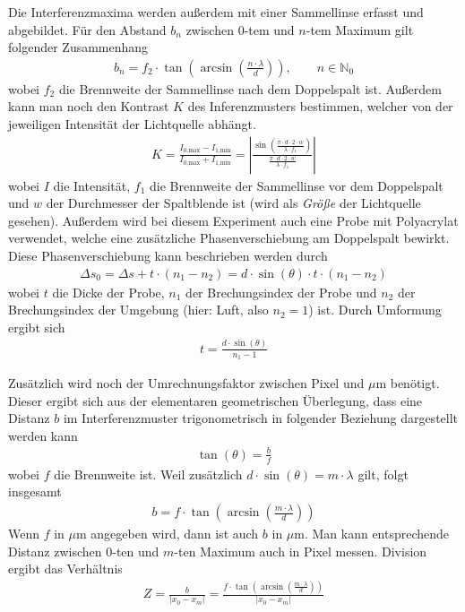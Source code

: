 \documentclass{article}
\begin{document}
Die Interferenzmaxima werden außerdem mit einer Sammellinse erfasst und abgebildet. Für den Abstand $b_n$ zwischen $0$-tem und $n$-tem Maximum gilt folgender Zusammenhang 
\begin{align}
b_n = f_2 \cdot \tan\left( \operatorname{arcsin}\left(\frac{n\cdot\lambda}{d}\right)\right), \qquad n\in\mathbb{N}_0
\end{align}
wobei $f_2$ die Brennweite der Sammellinse nach dem Doppelspalt ist. Außerdem kann man noch den Kontrast $K$ des Inferenzmusters bestimmen, welcher von der jeweiligen Intensität der Lichtquelle abhängt.
\begin{align}
K = \frac{I_\text{0,max}-I_\text{1,min}}{I_\text{0,max}+I_\text{1,min}} = \left| \frac{\sin\left(\frac{\pi\cdot d\cdot 2\cdot w}{\lambda\cdot f_1}\right)}{ \frac{\pi\cdot d\cdot 2\cdot w}{\lambda\cdot f_1} }\right|
 \label{eq:kontrast}
\end{align}
wobei $I$ die Intensität, $f_1$ die Brennweite der Sammellinse vor dem Doppelspalt und $w$ der Durchmesser der Spaltblende ist (wird als \textit{Größe} der Lichtquelle gesehen). Außerdem wird bei diesem Experiment auch eine Probe mit Polyacrylat verwendet, welche eine zusätzliche Phasenverschiebung am Doppelspalt bewirkt. Diese Phasenverschiebung kann beschrieben werden durch
\begin{align}
\Delta s_0 = \Delta s + t\cdot (n_1-n_2) = d\cdot\sin(\theta)\cdot t\cdot (n_1-n_2)
\end{align}
wobei $t$ die Dicke der Probe, $n_1$ der Brechungsindex der Probe und $n_2$ der Brechungsindex der Umgebung (hier: Luft, also $n_2 = 1$) ist. Durch Umformung ergibt sich
\begin{align}
\label{eq:schichtdicke}
t = \frac{d\cdot \sin(\theta)}{n_1-1}
\end{align}


Zusätzlich wird noch der Umrechnungsfaktor zwischen Pixel und $\mu$m benötigt. Dieser ergibt sich aus der elementaren geometrischen Überlegung, dass eine Distanz $b$ im Interferenzmuster trigonometrisch in folgender Beziehung dargestellt werden kann
\begin{align}
\label{eq:theta}
\tan(\theta) = \frac{b}{f}
\end{align}
wobei $f$ die Brennweite ist. Weil zusätzlich $d\cdot \sin(\theta) = m\cdot \lambda$ gilt, folgt insgesamt
\begin{align*}
b = f\cdot \tan\left(\operatorname{arcsin}\left(\frac{m\cdot \lambda}{d}\right)\right)
\end{align*}
Wenn $f$ in $\mu$m angegeben wird, dann ist auch $b$ in $\mu$m. Man kann entsprechende Distanz zwischen $0$-ten und $m$-ten Maximum auch in Pixel messen. Division ergibt das Verhältnis
\begin{align}
\label{eq:umrechnung}
Z = \frac{b}{|x_0-x_m|} = \frac{f\cdot \tan\left(\operatorname{arcsin}\left(\frac{m\cdot \lambda}{d}\right)\right)}{|x_0-x_m|}
\end{align}
\end{document}
